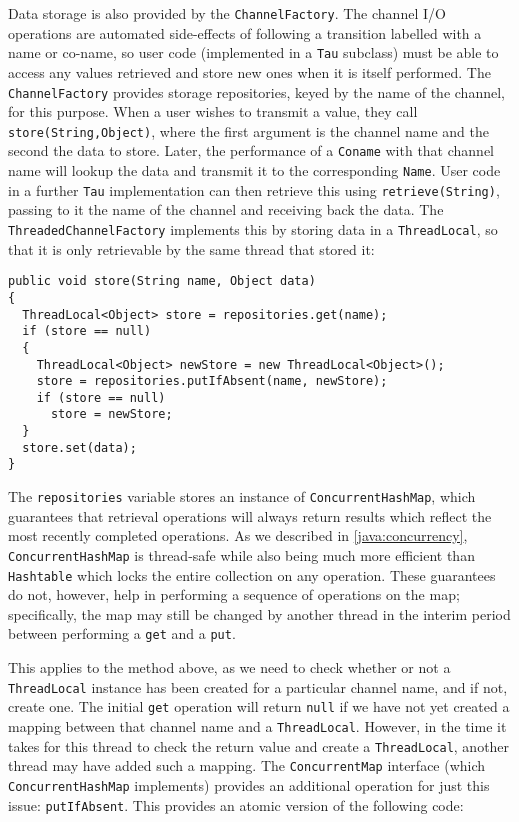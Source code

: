 Data storage is also provided by the \texttt{ChannelFactory}.  The
channel I/O operations are automated side-effects of following a
transition labelled with a name or co-name, so user code (implemented
in a \texttt{Tau} subclass) must be able to access any values
retrieved and store new ones when it is itself performed.  The
\texttt{ChannelFactory} provides storage repositories, keyed by the
name of the channel, for this purpose.  When a user wishes to transmit
a value, they call \texttt{store(String,Object)}, where the first
argument is the channel name and the second the data to store.  Later,
the performance of a \texttt{Coname} with that channel name will
lookup the data and transmit it to the corresponding \texttt{Name}.
User code in a further \texttt{Tau} implementation can then retrieve
this using \texttt{retrieve(String)}, passing to it the name of the
channel and receiving back the data.  The
\texttt{ThreadedChannelFactory} implements this by storing data in a
\texttt{ThreadLocal}, so that it is only retrievable by the same
thread that stored it:

\begin{verbatim}
public void store(String name, Object data)
{
  ThreadLocal<Object> store = repositories.get(name);
  if (store == null)
  {
    ThreadLocal<Object> newStore = new ThreadLocal<Object>();
    store = repositories.putIfAbsent(name, newStore);
    if (store == null)
      store = newStore;
  }
  store.set(data);
}
\end{verbatim}

The \texttt{repositories} variable stores an instance of
\texttt{ConcurrentHashMap}, which guarantees that retrieval operations
will always return results which reflect the most recently completed
operations.  As we described in \ref{java:concurrency},
\texttt{ConcurrentHashMap} is thread-safe while also being much more
efficient than \texttt{Hashtable} which locks the entire collection on
any operation.  These guarantees do not, however, help in performing a
sequence of operations on the map; specifically, the map may still be
changed by another thread in the interim period between performing a
\texttt{get} and a \texttt{put}.

This applies to the method above, as we need to check whether or not a
\texttt{ThreadLocal} instance has been created for a particular
channel name, and if not, create one.  The initial \texttt{get}
operation will return \texttt{null} if we have not yet created a mapping
between that channel name and a \texttt{ThreadLocal}.  However, in the
time it takes for this thread to check the return value and create a
\texttt{ThreadLocal}, another thread may have added such a mapping.
The \texttt{ConcurrentMap} interface (which \texttt{ConcurrentHashMap}
implements) provides an additional operation for just this issue:
\texttt{putIfAbsent}.  This provides an atomic version of the
following code:

